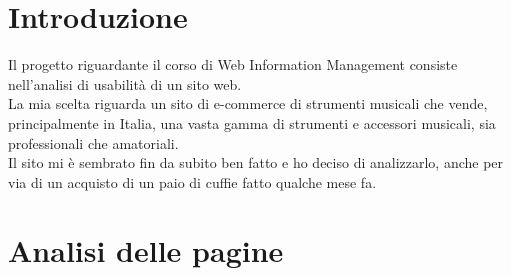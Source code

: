 \documentclass[12pt]{article}
\begin{document}
\begin{titlepage}
		
		\vfill %
	\end{titlepage}
	\newpage
	\renewcommand{\contentsname}{Indice}
	\tableofcontents
	
	\newpage
	\section{Introduzione}
	\vspace {0.5cm}
	Il progetto riguardante il corso di Web Information Management consiste nell'analisi di usabilità di un sito web.\\ La mia scelta riguarda un sito di e-commerce di strumenti musicali che vende, principalmente in Italia, una vasta gamma di strumenti e accessori musicali, sia professionali che amatoriali. 
	\\
	Il sito mi è sembrato fin da subito ben fatto e ho deciso di analizzarlo, anche per via di un acquisto di un paio di cuffie fatto qualche mese fa.
	\newpage
	\section{Analisi delle pagine}
\end{document}
